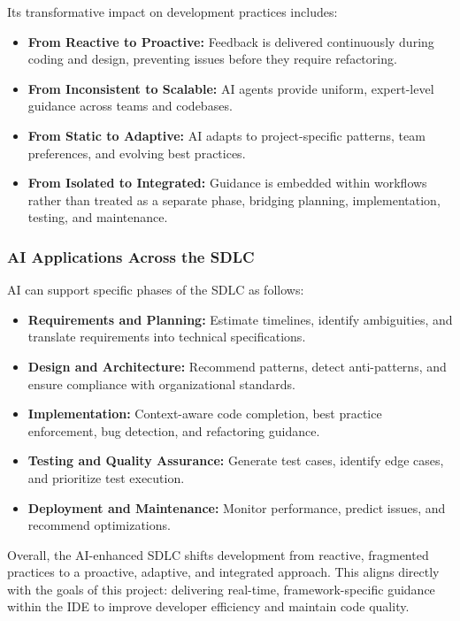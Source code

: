 \begin{spacing}{1.2}
Its transformative impact on development practices includes:

\begin{itemize}
\item \textbf{From Reactive to Proactive:} Feedback is delivered continuously during coding and design, preventing issues before they require refactoring.
\item \textbf{From Inconsistent to Scalable:} AI agents provide uniform, expert-level guidance across teams and codebases.
\item \textbf{From Static to Adaptive:} AI adapts to project-specific patterns, team preferences, and evolving best practices.
\item \textbf{From Isolated to Integrated:} Guidance is embedded within workflows rather than treated as a separate phase, bridging planning, implementation, testing, and maintenance.
\end{itemize}

\subsubsection{AI Applications Across the SDLC}
AI can support specific phases of the SDLC as follows:

\begin{itemize}
\item \textbf{Requirements and Planning:} Estimate timelines, identify ambiguities, and translate requirements into technical specifications.
\item \textbf{Design and Architecture:} Recommend patterns, detect anti-patterns, and ensure compliance with organizational standards.
\item \textbf{Implementation:} Context-aware code completion, best practice enforcement, bug detection, and refactoring guidance.
\item \textbf{Testing and Quality Assurance:} Generate test cases, identify edge cases, and prioritize test execution.
\item \textbf{Deployment and Maintenance:} Monitor performance, predict issues, and recommend optimizations.
\end{itemize}

Overall, the AI-enhanced SDLC shifts development from reactive, fragmented practices to a proactive, adaptive, and integrated approach. This aligns directly with the goals of this project: delivering real-time, framework-specific guidance within the IDE to improve developer efficiency and maintain code quality.


\end{spacing}
